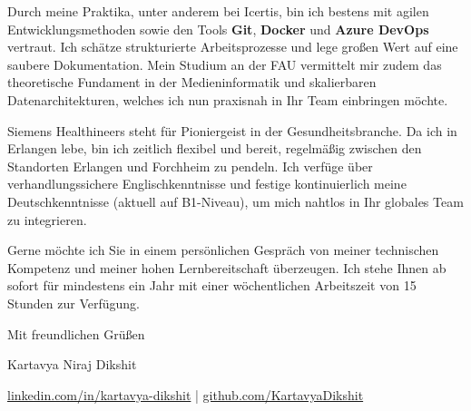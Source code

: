 \documentclass[10pt, a4paper]{article}
\begin{document}
Durch meine Praktika, unter anderem bei Icertis, bin ich bestens mit agilen Entwicklungsmethoden sowie den Tools \textbf{Git}, \textbf{Docker} und \textbf{Azure DevOps} vertraut. Ich schätze strukturierte Arbeitsprozesse und lege großen Wert auf eine saubere Dokumentation. Mein Studium an der FAU vermittelt mir zudem das theoretische Fundament in der Medieninformatik und skalierbaren Datenarchitekturen, welches ich nun praxisnah in Ihr Team einbringen möchte.

Siemens Healthineers steht für Pioniergeist in der Gesundheitsbranche. Da ich in Erlangen lebe, bin ich zeitlich flexibel und bereit, regelmäßig zwischen den Standorten Erlangen und Forchheim zu pendeln. Ich verfüge über verhandlungssichere Englischkenntnisse und festige kontinuierlich meine Deutschkenntnisse (aktuell auf B1-Niveau), um mich nahtlos in Ihr globales Team zu integrieren.

Gerne möchte ich Sie in einem persönlichen Gespräch von meiner technischen Kompetenz und meiner hohen Lernbereitschaft überzeugen. Ich stehe Ihnen ab sofort für mindestens ein Jahr mit einer wöchentlichen Arbeitszeit von 15 Stunden zur Verfügung.

\vspace{15pt}

\noindent Mit freundlichen Grüßen

\vspace{25pt}

\noindent Kartavya Niraj Dikshit

\vspace{20pt}

\noindent \footnotesize \color{gray}
\href{http://www.linkedin.com/in/kartavya-dikshit}{linkedin.com/in/kartavya-dikshit} \quad | \quad \href{https://github.com/KartavyaDikshit}{github.com/KartavyaDikshit}
\end{document}
